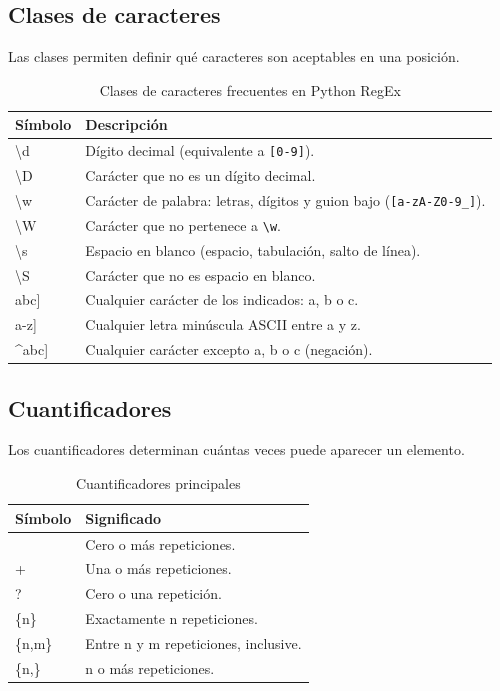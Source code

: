 \documentclass[12pt]{article}
\begin{document}
{\subsection{Clases de caracteres}
Las clases permiten definir qué caracteres son aceptables en una posición.
\begin{table}[h]
\centering
\caption{Clases de caracteres frecuentes en Python RegEx}
\begin{tabular}{>{\ttfamily}p{2.5cm}p{9.5cm}}
\toprule
\textnormal{\textbf{Símbolo}} & \textnormal{\textbf{Descripción}}\\
\midrule
\textbackslash d & Dígito decimal (equivalente a \texttt{[0-9]}).\\
\textbackslash D & Carácter que no es un dígito decimal.\\
\textbackslash w & Carácter de palabra: letras, dígitos y guion bajo (\texttt{[a-zA-Z0-9\_]}).\\
\textbackslash W & Carácter que no pertenece a \texttt{\textbackslash w}.\\
\textbackslash s & Espacio en blanco (espacio, tabulación, salto de línea).\\
\textbackslash S & Carácter que no es espacio en blanco.\\
{[}abc{]} & Cualquier carácter de los indicados: a, b o c.\\
{[}a-z{]} & Cualquier letra minúscula ASCII entre a y z.\\
{[}\^{}abc{]} & Cualquier carácter excepto a, b o c (negación).\\
\bottomrule
\end{tabular}
\end{table}

\subsection{Cuantificadores}
Los cuantificadores determinan cuántas veces puede aparecer un elemento.
\begin{table}[h]
\centering
\caption{Cuantificadores principales}
\begin{tabular}{>{\ttfamily}p{2.5cm}p{9.5cm}}
\toprule
\textnormal{\textbf{Símbolo}} & \textnormal{\textbf{Significado}}\\
\midrule
* & Cero o más repeticiones.\\
+ & Una o más repeticiones.\\
? & Cero o una repetición.\\
\{n\} & Exactamente n repeticiones.\\
\{n,m\} & Entre n y m repeticiones, inclusive.\\
\{n,\} & n o más repeticiones.\\
\bottomrule
\end{tabular}
\end{table}

}
\end{document}
